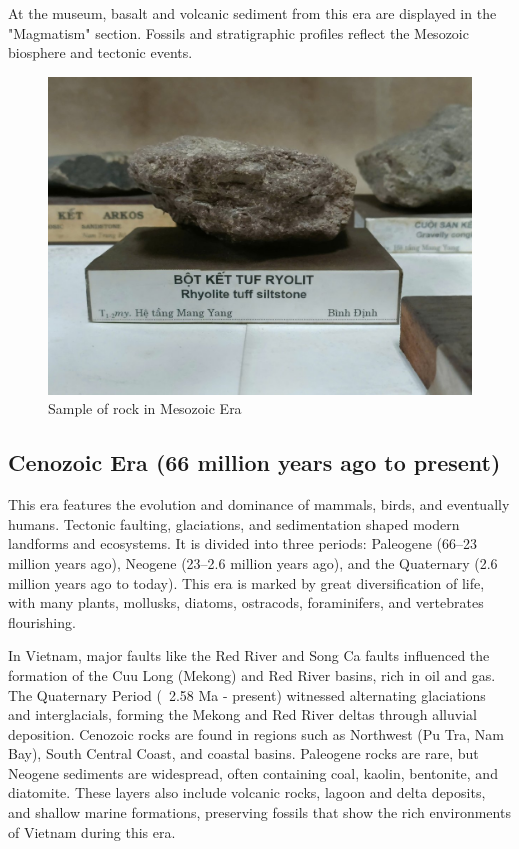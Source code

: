 At the museum, basalt and volcanic sediment from this era are displayed in the "Magmatism" section. Fossils and stratigraphic profiles reflect the Mesozoic biosphere and tectonic events.

\begin{figure}[H]
  \centering
  \includegraphics[max width=0.8\linewidth]{graphics/figure_05.jpg}
  \caption{Sample of rock in Mesozoic Era}
  \label{fig:mesozoic-rock}
\end{figure}

\subsection{Cenozoic Era (66 million years ago to present)}
\label{subsec:cenozoic}

This era features the evolution and dominance of mammals, birds, and eventually humans. Tectonic faulting, glaciations, and sedimentation shaped modern landforms and ecosystems. It is divided into three periods: Paleogene (66–23 million years ago), Neogene (23–2.6 million years ago), and the Quaternary (2.6 million years ago to today). This era is marked by great diversification of life, with many plants, mollusks, diatoms, ostracods, foraminifers, and vertebrates flourishing.

In Vietnam, major faults like the Red River and Song Ca faults influenced the formation of the Cuu Long (Mekong) and Red River basins, rich in oil and gas. The Quaternary Period (~2.58 Ma - present) witnessed alternating glaciations and interglacials, forming the Mekong and Red River deltas through alluvial deposition. Cenozoic rocks are found in regions such as Northwest (Pu Tra, Nam Bay), South Central Coast, and coastal basins. Paleogene rocks are rare, but Neogene sediments are widespread, often containing coal, kaolin, bentonite, and diatomite. These layers also include volcanic rocks, lagoon and delta deposits, and shallow marine formations, preserving fossils that show the rich environments of Vietnam during this era.

